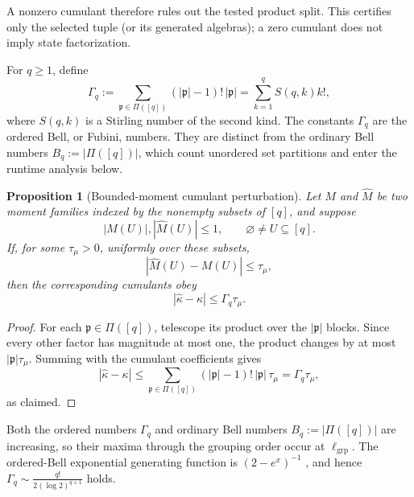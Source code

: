 \documentclass[
  aps,
  prx,
  reprint,
  superscriptaddress,
  amsmath,
  amssymb,
  nofootinbib,
  longbibliography
]{revtex4-2}
\newtheorem{proposition}[theorem]{Proposition}
\begin{document}
A nonzero cumulant therefore rules out the tested product split.  This
certifies only the selected tuple (or its generated algebras); a zero
cumulant does not imply state factorization.

For $q\ge 1$, define
\begin{equation}
\Gamma_q
:=
\sum_{\mathfrak p\in\Pi([q])}
(|\mathfrak p|-1)!\,|\mathfrak p|
=
\sum_{k=1}^q S(q,k)k!,
\label{eq:supp-cumulant-gamma-s}
\end{equation}
where $S(q,k)$ is a Stirling number of the second kind.
The constants $\Gamma_q$ are the ordered Bell, or Fubini, numbers.  They are
distinct from the ordinary Bell numbers
$B_q:=|\Pi([q])|$, which count unordered set partitions
\cite{smith2020multivariateKstatistics} and enter the runtime analysis below.

\begin{proposition}[Bounded-moment cumulant perturbation]
\label{prop:supp-bounded-moment-cumulant-perturbation}
Let $M$ and $\widehat M$ be two moment families indexed by the nonempty
subsets of $[q]$, and suppose
\begin{equation}
|M(U)|,|\widehat M(U)|\le1,
\qquad
\varnothing\ne U\subseteq[q].
\end{equation}
If, for some $\tau_\mu>0$, uniformly over these subsets,
\begin{equation}
|\widehat M(U)-M(U)|\le\tau_\mu,
\end{equation}
then the corresponding cumulants obey
\begin{equation}
|\widehat\kappa-\kappa|
\le
\Gamma_q\tau_\mu.
\label{eq:supp-bounded-moment-cumulant-perturbation}
\end{equation}
\end{proposition}

\begin{proof}
For each $\mathfrak p\in\Pi([q])$, telescope its product over the
$|\mathfrak p|$ blocks.  Since every other factor has magnitude at most one,
the product changes by at most $|\mathfrak p|\tau_\mu$.  Summing with the
cumulant coefficients gives
\begin{equation}
|\widehat\kappa-\kappa|
\le
\sum_{\mathfrak p\in\Pi([q])}
(|\mathfrak p|-1)!\,|\mathfrak p|\,\tau_\mu
=
\Gamma_q\tau_\mu,
\end{equation}
as claimed.
\end{proof}

Both the ordered numbers $\Gamma_q$ and ordinary Bell numbers
$B_q:=|\Pi([q])|$ are increasing, so their maxima through the grouping order
occur at $\ell_{\mathrm{grp}}$.
The ordered-Bell exponential generating function is $(2-e^x)^{-1}$
\cite{doubilet1972foundations}, and hence $\Gamma_q
\sim
\frac{q!}{2(\log 2)^{q+1}}$ holds.
\end{document}

